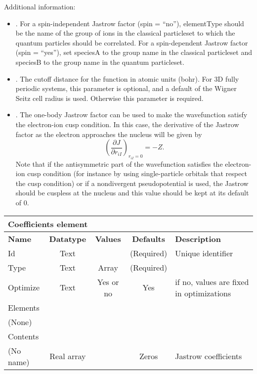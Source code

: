 Additional information:

 \begin{itemize}
 \item {}.  For a spin-independent Jastrow factor (spin = ``no''),
elementType should be the name of the group of ions in the classical particleset to which the quantum
particles should be correlated.  For a spin-dependent Jastrow factor (spin = ``yes''), set speciesA to the
group name in the classical particleset and speciesB to the group name in the quantum particleset.
 \item {}. The cutoff distance for the function in atomic units (bohr). 
For 3D fully periodic systems, this parameter is optional, and a default of the Wigner 
Seitz cell radius is used. Otherwise this parameter is required.
 \item {}. The one-body Jastrow factor can be used to make the wavefunction
satisfy the electron-ion cusp condition\cite{kato}.  In this case, the derivative of the Jastrow
factor as the electron approaches the nucleus will be given by
\begin{equation}
\left(\frac{\partial J}{\partial r_{iI}}\right)_{r_{iI} = 0} = -Z .
\end{equation}
Note that if the antisymmetric part of the wavefunction satisfies the electron-ion cusp
condition (for instance by using single-particle orbitals that respect the cusp condition)
or if a nondivergent pseudopotential is used, the Jastrow should be cuspless at the 
nucleus and this value should be kept at its default of 0.
 \end{itemize}


\begin{table}[h]
\begin{center}
\begin{tabular}{l c c c l }
\hline
\multicolumn{5}{l}{Coefficients element} \\
\hline
\bfseries Name & \bfseries Datatype & \bfseries Values & \bfseries Defaults & \bfseries Description \\
\hline
Id & Text & & (Required) & Unique identifier \\
Type & Text & Array & (Required) & \\
Optimize & Text & Yes or no & Yes & if no, values are fixed in optimizations \\
\hline
\multicolumn{5}{l}{Elements}\\ \hline
(None) & & & \\ \hline
\multicolumn{5}{l}{Contents}\\ \hline
 (No name) & Real array & & Zeros & Jastrow coefficients \\ \hline
\end{tabular}
\end{center}
\end{table}



